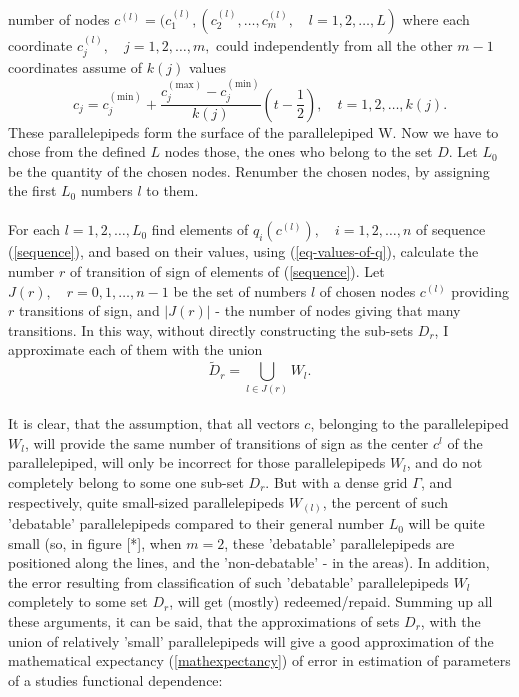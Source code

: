 \documentclass[a4paper]{article}
\numberwithin{equation}{subsection}
\begin{document}
number of nodes $c^{(l)} = (c_{1}^{(l)},(c_{2}^{(l)},\dots,c_{m}^{(l)},\quad l=1,2,\dots,L)$ where each coordinate $c_{j}^{(l)}, \quad j=1,2,\dots,m,$ could independently from all the other $m-1$ coordinates assume of $k(j)$ values
\begin{equation}
c_{j}=c_{j}^{(\text{min})} + \frac{c_{j}^{(\text{max})}-c_{j}^{(\text{min})}}{k(j)}(t-\frac{1}{2}), \quad t=1,2,\dots,k(j).
\end{equation}
These parallelepipeds form the surface of the parallelepiped W. Now we have to chose from the defined $L$ nodes those, the ones who belong to the set $D$. Let $L_{0}$ be the quantity of the chosen nodes. Renumber the chosen nodes, by assigning the first $L_{0}$ numbers $l$ to them. \\
\\
For each $l=1,2,\dots,L_{0}$ find elements of $q_{i}(c^{(l)}), \quad i=1,2,\dots,n$ of sequence (\ref{sequence}), and based on their values, using (\ref{eq-values-of-q}), calculate the number $r$ of transition of sign of elements of (\ref{sequence}). Let $J(r), \quad r=0,1,\dots,n-1$ be the set of numbers $l$ of chosen nodes $c^{(l)}$ providing $r$ transitions of sign, and $|J(r)|$ - the number of nodes giving that many transitions. In this way, without directly constructing the sub-sets $D_{r}$, I approximate each of them with the union
\begin{equation}
\tilde{D}_{r} = \bigcup_{l \in J(r)} W_{l}.
\end{equation}
\\
It is clear, that the assumption, that all vectors $c$, belonging to the parallelepiped $W_{l}$, will provide the same number of transitions of sign as the center $c^{l}$ of the parallelepiped, will only be incorrect for those parallelepipeds $W_{l}$, and do not completely belong to some one sub-set $D_{r}$. But with a dense grid $\Gamma$, and respectively, quite small-sized parallelepipeds $W_{(l)}$, the percent of such 'debatable' parallelepipeds compared to their general number $L_{0}$ will be quite small (so, in figure [*], when $m=2$, these 'debatable' parallelepipeds are positioned along the lines, and the 'non-debatable' - in the areas). In addition, the error resulting from classification of such 'debatable' parallelepipeds $W_{l}$ completely to some set $D_{r}$, will get (mostly) redeemed/repaid. Summing up all these arguments, it can be said, that the approximations of sets $D_{r}$, with the union of relatively 'small' parallelepipeds will give a good  approximation of the mathematical expectancy (\ref{mathexpectancy}) of error in estimation of parameters of a studies functional dependence:
\end{document}
